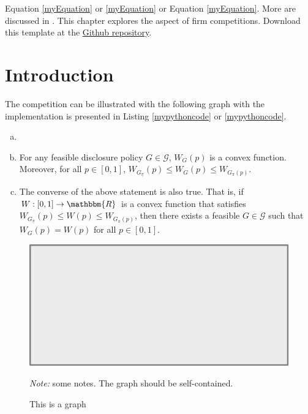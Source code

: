 Equation \ref{myEquation} or \cref{myEquation} or Equation \eqref{myEquation}. \lipsum[105-106] More are discussed in . This chapter explores the aspect of firm competitions. \lipsum[11] \lipsum[11]Download this template at the \href{https://github.com/howardhsumail/Dissertation-LaTeX-Template.git}{Github repository}.

\section{Introduction}

The {\color{mycolor}competition} can be illustrated with the following graph with the implementation is presented in Listing \ref{mypythoncode} or \cref{mypythoncode}.

\begin{lemma}\label{lma1}
  \onehalfspacing
  \begin{enumerate}[(a)]
    \setlength{\itemsep}{-0.5pt}
    \item[] \hfill
    \item For any feasible disclosure policy  $G\in \mathcal{G}$, $W_G(p)$ is a convex function. Moreover, for all $p\in[0,1]$, $W_{G_{\underline{\pi}}}(p)\leq W_G(p)\leq W_{G_{\overline{\pi}}(p)}$.
    \item The converse of the above statement is also true. That is, if $W:[0,1]\to \mathbbm{R}$ is a convex function that satisfies $W_{G_{\underline{\pi}}}(p)\leq W(p)\leq W_{G_{\overline{\pi}}(p)}$, then there exists a feasible $G\in\mathcal{G}$ such that $W_G(p) = W(p)$ for all $p\in[0,1]$.
  \end{enumerate}
\end{lemma}

\lipsum[14]

\begin{figure}[H]
  \centering
  \includegraphics[scale=0.5]{Graph/pic.pdf}
  \caption{This is a graph}
  \hspace*{-0.6cm}
  \begin{minipage}{1.04\textwidth}
    \onehalfspacing
    \vspace*{0.12cm}
    \begin{tablenotes}
      \footnotesize
      \item\textit{Note:} some notes. The graph should be self-contained. \lipsum[66]
    \end{tablenotes}
  \end{minipage}
\end{figure}

